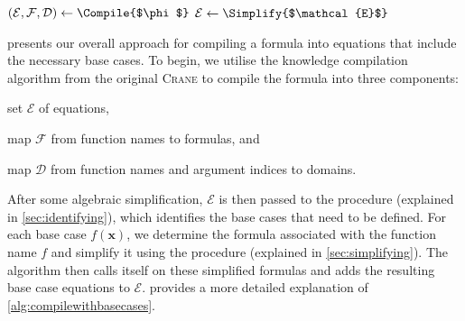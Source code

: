 \documentclass{article}
\theoremstyle{remark}
\begin{document}
\begin{algorithm}[t]
  \caption{\protect\CompileWithBaseCases{$\phi$}}\label{alg:compilewithbasecases}
  $(\mathcal{E}, \mathcal{F}, \mathcal{D}) \gets \Compile{$\phi$}$\;\label{line:first}
  $\mathcal{E} \gets \Simplify{$\mathcal{E}$}$\;\label{line:second}
\end{algorithm}

 presents our overall approach for compiling a
formula into equations that include the necessary base cases. To begin, we
utilise the knowledge compilation algorithm from the original \textsc{Crane} to
compile the formula into three components:
\begin{enumerate*}[label=(\roman*)]
  \item set $\mathcal{E}$ of equations,
  \item map $\mathcal{F}$ from function names to formulas, and
  \item map $\mathcal{D}$ from function names and argument indices to domains.
\end{enumerate*}
After some algebraic simplification, $\mathcal{E}$ is then passed to the
\FindBaseCases procedure (explained in \cref{sec:identifying}), which identifies
the base cases that need to be defined. For each base case $f(\mathbf{x})$, we
determine the formula associated with the function name $f$ and simplify it
using the \Propagate procedure (explained in \cref{sec:simplifying}). The
algorithm then calls itself on these simplified formulas and adds the resulting
base case equations to $\mathcal{E}$.  provides a more
detailed explanation of \cref{alg:compilewithbasecases}.
\end{document}
